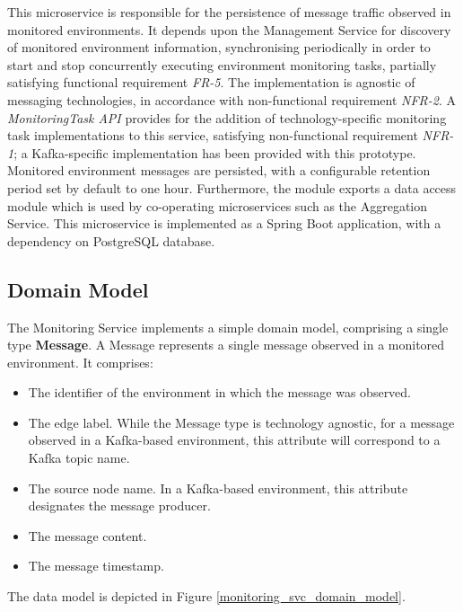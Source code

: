 This microservice is responsible for the persistence of message traffic observed in monitored environments. It depends upon the Management Service for discovery of monitored environment information, synchronising periodically in order to start and stop concurrently executing environment monitoring tasks, partially satisfying functional requirement \textit{FR-5}. The implementation is agnostic of messaging technologies, in accordance with non-functional requirement \textit{NFR-2}. A \textit{MonitoringTask API} provides for the addition of technology-specific monitoring task implementations to this service, satisfying non-functional requirement \textit{NFR-1}; a Kafka-specific implementation has been provided with this prototype. Monitored environment messages are persisted, with a configurable retention period set by default to one hour. Furthermore, the module exports a data access module which is used by co-operating microservices such as the Aggregation Service. This microservice is implemented as a Spring Boot application, with a dependency on PostgreSQL database.

\subsection{Domain Model}
The Monitoring Service implements a simple domain model, comprising a single type \textbf{Message}. A Message represents a single message observed in a monitored environment. It comprises:

\begin{itemize}
	\item The identifier of the environment in which the message was observed.
	\item The edge label. While the Message type is technology agnostic, for a message observed in a Kafka-based environment, this attribute will correspond to a Kafka topic name.
	\item The source node name. In a Kafka-based environment, this attribute designates the message producer.
	\item The message content.
	\item The message timestamp.
\end{itemize}

The data model is depicted in Figure \ref{monitoring_svc_domain_model}.

\vspace{10 mm}

